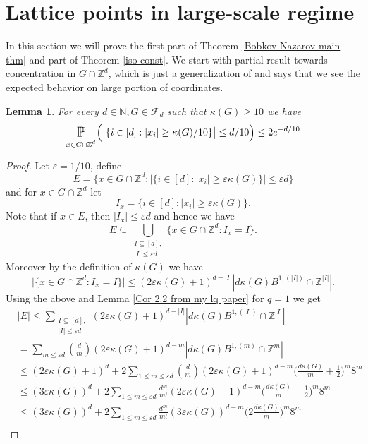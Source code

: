 \documentclass[10pt,a4paper]{amsart}
\numberwithin{equation}{section}
\newtheorem{Lem}[Thm]{Lemma}
\newcommand{\Pro}{\mathop{\mathbb{P}}}
\newcommand{\Z}{\mathbb{Z}}
\newcommand{\N}{\mathbb{N}}
\newcommand{\spr}[1]{\underset{_{\substack{#1}}}{\mathlarger{\mathlarger{\Pro}}}}
\begin{document}
\section{Lattice points in large-scale regime}
In this section we will prove the first part of Theorem \ref{Bobkov-Nazarov main thm} and part of Theorem \ref{iso const}.
We start with partial result towards concentration in $G \cap \Z^d$, which is just a generalization of \cite[Lemma 2.4]{balls} and says that we see the expected behavior on large portion of coordinates.
\begin{Lem} \label{pos_prop_conc}
For every $d \in \N, G \in \mathcal{F}_d$ such that $\kappa(G) \ge 10$ we have
\[
\spr{x \in G \cap \Z^d} \Big(\big| \{ i \in [d]: |x_i| \ge  \kappa(G)/10 \}\big| \le  d/10\Big) \le 2 e^{-d/10} 
\]
\end{Lem}
\begin{proof}
Let $\varepsilon=1/10$, define
\[
E=\Big\{ x \in G \cap \Z^d: | \{ i \in [d]: |x_i| \ge \varepsilon \kappa(G) \}| \le \varepsilon d \Big\}
\]
and for $x \in G \cap \Z^d$ let
\[
I_x= \big\{ i \in [d]: |x_i| \ge \varepsilon \kappa(G) \big\}.
\]
Note that if $x \in E$, then $|I_x| \le \varepsilon d$ and hence we have 
\[
E \subseteq \bigcup_{\substack{I \subseteq [d], \\ |I| \le \varepsilon d}} \Big\{ x\in G \cap \Z^d: I_x=I \Big\}.
\]
Moreover by the definition of $\kappa(G)$ we have
\[
\Big|  \Big\{ x\in G \cap \Z^d: I_x=I \Big\} \Big| \le (2 \varepsilon \kappa(G)+1)^{d-|I|} |d \kappa(G) B^{1,(|I|)} \cap \Z^{|I|}|.
\]
Using the above and Lemma \ref{Cor 2.2 from my lq paper} for $q=1$ we get
\begin{equation}
    \begin{split}
    &|E| \le \sum_{\substack{I \subseteq [d], \\ |I| \le \varepsilon d}}  (2 \varepsilon \kappa(G)+1)^{d-|I|} |d \kappa(G) B^{1,(|I|)} \cap \Z^{|I|}|\\
    &= \sum_{m \le \varepsilon d} \binom{d}{m}(2 \varepsilon \kappa(G)+1)^{d-m} |d \kappa(G) B^{1,(m)} \cap \Z^{m}| \\
    &\le (2\varepsilon \kappa(G)+1)^d+ 2 \sum_{1 \le m \le \varepsilon d} \binom{d}{m}(2 \varepsilon \kappa(G)+1)^{d-m} \Big(\frac{d\kappa(G)}{m}+\frac{1}{2}\Big)^m 8^m \\
    &\le (3\varepsilon \kappa(G))^d+2 \sum_{1 \le m \le \varepsilon d}\frac{d^m}{m!}(2 \varepsilon \kappa(G)+1)^{d-m} \Big(\frac{d\kappa(G)}{m}+\frac{1}{2}\Big)^m 8^m \\
    &\le (3\varepsilon \kappa(G))^d+2 \sum_{1 \le m \le \varepsilon d}\frac{d^m}{m!}(3 \varepsilon \kappa(G))^{d-m} \Big(2\frac{d\kappa(G)}{m}\Big)^m 8^m \\

\end{split}
\end{equation}
\end{proof}
\end{document}
